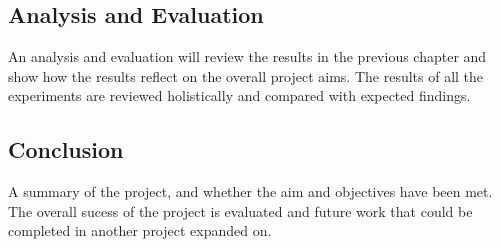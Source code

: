 \subsection*{Analysis and Evaluation}
An analysis and evaluation will review the results in the previous chapter and
show how the results reflect on the overall project aims. The results of all the experiments are reviewed holistically and compared with
expected findings. 
\subsection*{Conclusion}
A summary of the project, and whether the aim and objectives have been met. The
overall sucess of the project is evaluated and future work that could be
completed in another project expanded on.